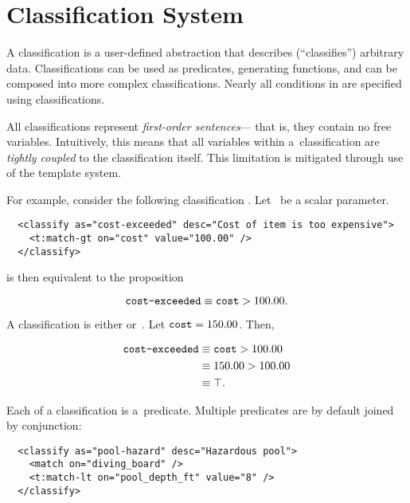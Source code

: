 
\section{Classification System}
A \gls{classification} is a user-defined abstraction that describes
  (``classifies'') arbitrary data.
Classifications can be used as predicates, generating functions, and can be
  composed into more complex classifications.
Nearly all conditions in \tame{} are specified using classifications.

All classifications represent \emph{first-order sentences}---%
  that is,
    they contain no \glspl{free variable}.
Intuitively,
  this means that all variables within a~classification are
  \emph{tightly coupled} to the classification itself.
This limitation is mitigated through use of the template system.

For example,
  consider the following classification .
Let~ be a scalar parameter.

\begin{lstlisting}
  <classify as="cost-exceeded" desc="Cost of item is too expensive">
    <t:match-gt on="cost" value="100.00" />
  </classify>
\end{lstlisting}

\noindent
is then equivalent to the proposition

\begin{equation*}
  \texttt{cost-exceeded} \equiv \texttt{cost} > 100.00.
\end{equation*}

A classification is either  or~.
Let $\texttt{cost}=150.00$.
Then,

\begin{align*}
  \texttt{cost-exceeded} & \equiv \texttt{cost} > 100.00 \\
                            & \equiv 150.00 > 100.00 \\
                            & \equiv \top.
\end{align*}

Each  of a classification is a~\gls{predicate}.
Multiple predicates are by default joined by \gls{conjunction}:

\begin{lstlisting}
  <classify as="pool-hazard" desc="Hazardous pool">
    <match on="diving_board" />
    <t:match-lt on="pool_depth_ft" value="8" />
  </classify>
\end{lstlisting}

